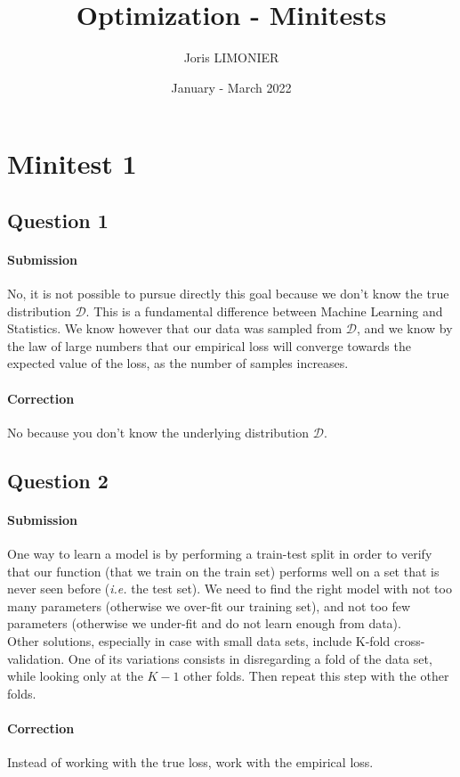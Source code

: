 \documentclass{article}
\title{Optimization - Minitests}
\author{Joris LIMONIER}
\date{January - March 2022}
\newcommand{\1}{\mathbf{1}}
\newcommand{\ie}{\textit{i.e. }}
\begin{document}
\maketitle
\tableofcontents

\section{Minitest 1}
\subsection{Question 1}
\paragraph{Submission}
No, it is not possible to pursue directly this goal because we don't know the true distribution \(\mathcal{D}\). This is a fundamental difference between Machine Learning and Statistics. We know however that our data was sampled from \(\mathcal{D}\), and we know by the law of large numbers that our empirical loss will converge towards the expected value of the loss, as the number of samples increases.
\paragraph{Correction} No because you don't know the underlying distribution \(\mathcal{D}\).

\subsection{Question 2}
\paragraph{Submission}
One way to learn a model is by performing a train-test split in order to verify that our function (that we train on the train set) performs well on a set that is never seen before (\ie the test set). We need to find the right model with not too many parameters (otherwise we over-fit our training set), and not too few parameters (otherwise we under-fit and do not learn enough from data). \\
Other solutions, especially in case with small data sets, include K-fold cross-validation. One of its variations consists in disregarding a fold of the data set, while looking only at the \(K-1\) other folds. Then repeat this step with the other folds.
\paragraph{Correction} Instead of working with the true loss, work with the empirical loss.
\end{document}

